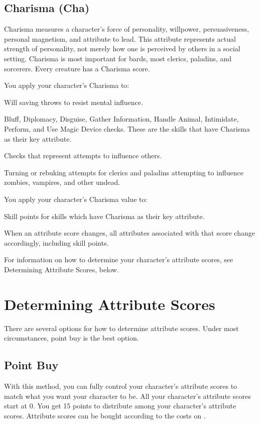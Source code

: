 \subsection{Charisma (Cha)}
Charisma measures a character's force of personality, willpower, persuasiveness, personal magnetism, and attribute to lead. This attribute represents actual strength of personality, not merely how one is perceived by others in a social setting. Charisma is most important for bards, most clerics, paladins, and sorcerers. Every creature has a Charisma score.

You apply your character's Charisma to:
\begin{itemize*}
\item Will saving throws to resist mental influence.
\item Bluff, Diplomacy, Disguise, Gather Information, Handle Animal, Intimidate, Perform, and Use Magic Device checks. These are the skills that have Charisma as their key attribute.
\item Checks that represent attempts to influence others.
\item Turning or rebuking attempts for clerics and paladins attempting to influence zombies, vampires, and other undead.
\end{itemize*}
You apply your character's Charisma value to:
\begin{itemize*}
\item Skill points for skills which have Charisma as their key attribute.
\end{itemize*}

When an attribute score changes, all attributes associated with that score change accordingly, including skill points.

For information on how to determine your character's attribute scores, see Determining Attribute Scores, below.

\section{Determining Attribute Scores}
There are several options for how to determine attribute scores. Under most circumstances, point buy is the best option.

\subsection{Point Buy}
With this method, you can fully control your character's attribute scores to match what you want your character to be. All your character's attribute scores start at 0. You get 15 points to distribute among your character's attribute scores. Attribute scores can be bought according to the costs on .


